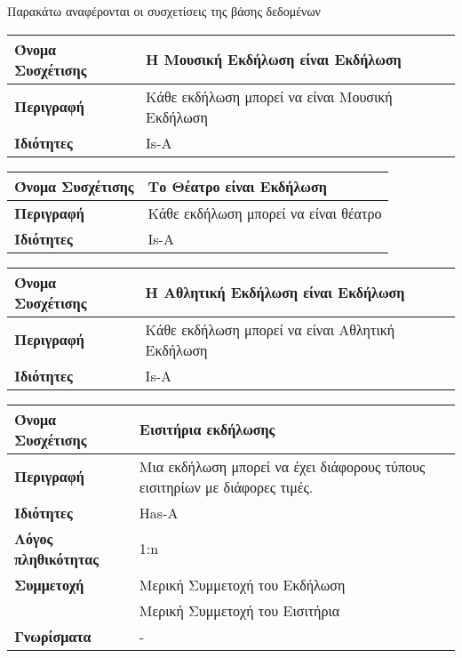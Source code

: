 Παρακάτω αναφέρονται οι συσχετίσεις της βάσης δεδομένων \titlos
\begin{center}
\begin{tabular}[]{|p{4cm}|p{10cm}|}
  \hline
  \textbf{Όνομα Συσχέτισης} & Η Μουσική Εκδήλωση είναι Εκδήλωση\\ \hline
  \textbf{Περιγραφή} & Κάθε εκδήλωση μπορεί να είναι Μουσική Εκδήλωση\\ \hline
  \textbf{Ιδιότητες} & Is-A  \\ \hline
\end{tabular}
\vspace{0.3 cm}

\begin{tabular}[]{|p{4cm}|p{10cm}|}
  \hline
  \textbf{Όνομα Συσχέτισης} & Το Θέατρο είναι Εκδήλωση\\ \hline
  \textbf{Περιγραφή} & Κάθε εκδήλωση μπορεί να είναι θέατρο\\ \hline
  \textbf{Ιδιότητες} & Is-A  \\ \hline
\end{tabular}
\vspace{0.3 cm}

\begin{tabular}[]{|p{4cm}|p{10cm}|}
  \hline
  \textbf{Όνομα Συσχέτισης} & Η Αθλητική Εκδήλωση είναι Εκδήλωση\\ \hline
  \textbf{Περιγραφή} & Κάθε εκδήλωση μπορεί να είναι Αθλητική Εκδήλωση\\ \hline
  \textbf{Ιδιότητες} & Is-A  \\ \hline
\end{tabular}
\vspace{0.3 cm}

\begin{tabular}[]{|p{4cm}|p{10cm}|}
  \hline
  \textbf{Όνομα Συσχέτισης}   & Εισιτήρια εκδήλωσης            \\ \hline
  \textbf{Περιγραφή}          & Μια εκδήλωση μπορεί να έχει διάφορους τύπους
                             εισιτηρίων με διάφορες τιμές.     \\ \hline
  \textbf{Ιδιότητες}          & Has-A                          \\ \hline
  \textbf{Λόγος πληθικότητας} & 1:n                            \\ \hline
  \textbf{Συμμετοχή}          & Μερική Συμμετοχή του Εκδήλωση  \\ \cline{2-2}
                              & Μερική Συμμετοχή του Εισιτήρια \\ \hline
  \textbf{Γνωρίσματα}         & -                              \\ \hline
\end{tabular}
\vspace{0.3 cm}


\end{center}
